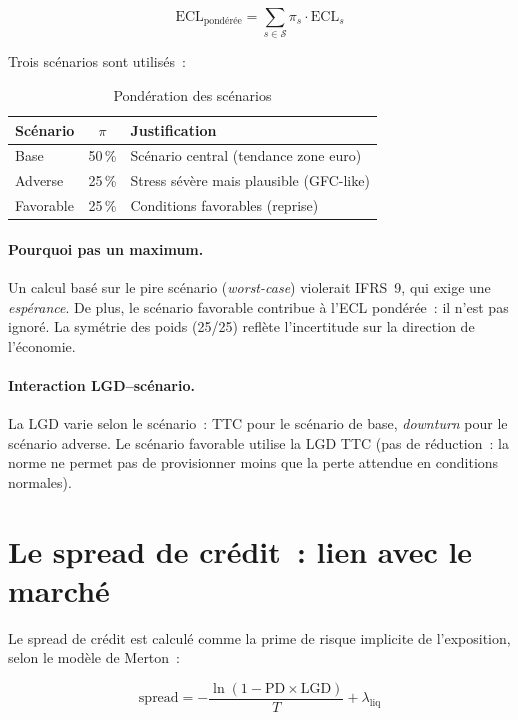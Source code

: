 \documentclass[12pt, a4paper, twoside, openright]{report}
\theoremstyle{definition}
\begin{document}
\begin{equation}
\text{ECL}_{\text{pondérée}} = \sum_{s \in \mathcal{S}} \pi_s \cdot \text{ECL}_s
\label{eq:ecl-weighted}
\end{equation}

Trois scénarios sont utilisés~:

\begin{table}[htbp]
\centering
\caption{Pondération des scénarios}
\label{tab:scenarios-poids}
\begin{tabular}{lcp{6cm}}
\toprule
Scénario & $\pi$ & Justification \\
\midrule
Base & 50\,\% & Scénario central (tendance zone euro) \\
Adverse & 25\,\% & Stress sévère mais plausible (GFC-like) \\
Favorable & 25\,\% & Conditions favorables (reprise) \\
\bottomrule
\end{tabular}
\end{table}

\paragraph{Pourquoi pas un maximum.} Un calcul basé sur le pire scénario (\emph{worst-case}) violerait IFRS~9, qui exige une \emph{espérance}. De plus, le scénario favorable contribue à l'ECL pondérée~: il n'est pas ignoré. La symétrie des poids (25/25) reflète l'incertitude sur la direction de l'économie.

\paragraph{Interaction LGD--scénario.} La LGD varie selon le scénario~: TTC pour le scénario de base, \emph{downturn} pour le scénario adverse. Le scénario favorable utilise la LGD TTC (pas de réduction~: la norme ne permet pas de provisionner moins que la perte attendue en conditions normales).

\section{Le spread de crédit~: lien avec le marché}
\label{sec:ecl:spread}

Le spread de crédit est calculé comme la prime de risque implicite de l'exposition, selon le modèle de Merton~:

\begin{equation}
\text{spread} = -\frac{\ln(1 - \text{PD} \times \text{LGD})}{T} + \lambda_{\text{liq}}
\label{eq:spread}
\end{equation}
\end{document}
